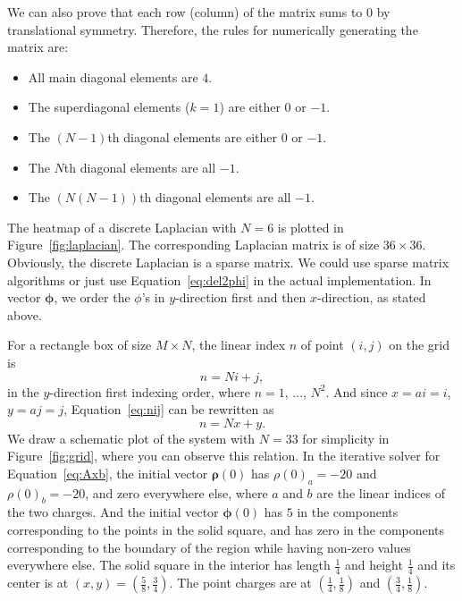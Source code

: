 We can also prove that each row (column) of the matrix sums to \(0\) by
translational symmetry. Therefore, the rules for numerically generating
the matrix are\footnotemark{}:
%
\begin{itemize}
    \item All main diagonal elements are \(4\).
    \item The superdiagonal elements (\(k = 1\)) are either \(0\) or \(-1\).
    \item The \((N-1)\)th diagonal elements are either \(0\) or \(-1\).
    \item The \(N\)th diagonal elements are all \(-1\).
    \item The \((N(N - 1))\)th diagonal elements are all \(-1\).
\end{itemize}
%

The heatmap of a discrete Laplacian with \(N = 6\) is plotted in Figure~\ref{fig:laplacian}.
The corresponding Laplacian matrix is of size \(36 \times 36\).
Obviously, the discrete Laplacian is a sparse matrix.
We could use sparse matrix algorithms or just use Equation~\eqref{eq:del2phi} in the actual
implementation.
In vector \(\bm{\phi}\), we order the \(\phi\)'s in \(y\)-direction first and then
\(x\)-direction, as stated above.

For a rectangle box of size \(M \times N\), the linear index \(n\) of point \((i, j)\)
on the grid is
%
\begin{equation}\label{eq:nij}
    n = N i + j,
\end{equation}
%
in the \(y\)-direction first indexing order, where \(n = 1\), \(\ldots\), \(N^2\).
And since \(x = a i = i\), \(y = a j = j\), Equation~\eqref{eq:nij} can be rewritten as
%
\begin{equation}
    n = N x + y.
\end{equation}
%
We draw a schematic plot of the system with \(N = 33\) for simplicity in
Figure~\ref{fig:grid}, where you can observe this relation.
In the iterative solver for Equation~\eqref{eq:Axb},
the initial vector \(\bm{\rho}(0)\) has \(\rho(0)_a = -20\) and \(\rho(0)_b = -20\),
and zero everywhere else,
where \(a\) and \(b\) are the linear indices of the two charges.
And the initial vector \(\bm{\phi}(0)\) has \(5\) in the components corresponding to
the points in the solid square, and has zero in the components corresponding to
the boundary of the region while having non-zero values everywhere else.
The solid square in the interior has length \(\frac{1}{4}\) and height \(\frac{1}{4}\) and
its center is at \((x, y) = (\frac{5}{8}, \frac{3}{4})\).
The point charges are at \((\frac{1}{4}, \frac{1}{8})\) and \((\frac{3}{4}, \frac{1}{8})\).

